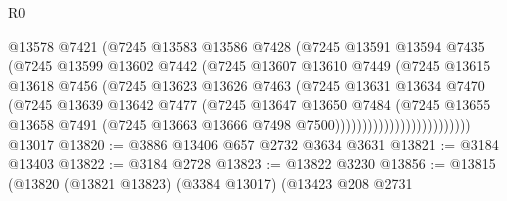 \begin{lexlean}{R0}
\begin{coremodule}
                                @13578
                                @7421
                                (@7245
                                  @13583
                                  @13586
                                  @7428
                                  (@7245
                                    @13591
                                    @13594
                                    @7435
                                    (@7245
                                      @13599
                                      @13602
                                      @7442
                                      (@7245
                                        @13607
                                        @13610
                                        @7449
                                        (@7245
                                          @13615
                                          @13618
                                          @7456
                                          (@7245
                                            @13623
                                            @13626
                                            @7463
                                            (@7245
                                              @13631
                                              @13634
                                              @7470
                                              (@7245
                                                @13639
                                                @13642
                                                @7477
                                                (@7245
                                                  @13647
                                                  @13650
                                                  @7484
                                                  (@7245
                                                    @13655
                                                    @13658
                                                    @7491
                                                    (@7245
                                                      @13663
                                                      @13666
                                                      @7498
                                                      @7500)))))))))))))))))))))))))
    @13017
@13820 := @3886 @13406 @657 @2732 @3634 @3631
@13821 := @3184 @13403
@13822 := @3184 @2728
@13823 := @13822 @3230
@13856 := @13815
    (@13820
      (@13821 @13823)
      (@3384 @13017)
      (@13423
        @208
        @2731

\end{coremodule}
\end{lexlean}
